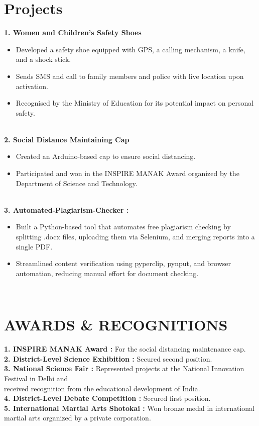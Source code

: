 \documentclass[10pt]{article} %
\begin{document}
\section{Projects}
{
{\bf1.  Women and Children's Safety Shoes} \begin{itemize}
    \item  Developed a safety shoe equipped with GPS, a calling mechanism, a knife, and a shock stick.
    \item Sends SMS and call to family members and police with live
location upon activation.
    \item Recognised by the Ministry of Education for its potential impact
on personal safety.
\end{itemize} \\

{\bf2. Social Distance Maintaining Cap} \begin{itemize}
    \item  Created an Arduino-based cap to ensure social distancing.
    \item Participated and won in the INSPIRE MANAK Award organized
by the Department of Science and Technology.

\end{itemize} \\

{\bf3. Automated-Plagiarism-Checker :} \begin{itemize}
    \item  Built a Python-based tool that automates free plagiarism checking by splitting .docx files, uploading them via Selenium, and merging reports into a single PDF.
    \item Streamlined content verification using pyperclip, pynput, and browser automation, reducing manual effort for document checking.

\end{itemize} \\


\section{AWARDS \& RECOGNITIONS}
{
{\bf1.  INSPIRE MANAK Award :} \> For the social distancing maintenance cap. \\
{\bf2. District-Level Science Exhibition : } \> Secured second position. \\
{\bf3. National Science Fair : } \> Represented projects at the National Innovation Festival in Delhi and \\ received recognition from the educational development of India. \\
{\bf4. District-Level Debate Competition :} \>Secured first position. \\
{\bf5. International Martial Arts Shotokai :} \>Won bronze medal in
international martial arts organized by a private corporation.\\
}




}
\end{document}
